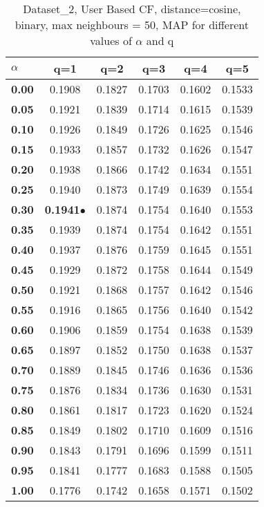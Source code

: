 \begin{table}
\begin{center}
\begin{tabular}{ | l || c | c | c | c | c |}
\hline
\textbf{$\alpha$} & \textbf{q=1} & \textbf{q=2} & \textbf{q=3} & \textbf{q=4} & \textbf{q=5} \\
\hline
\textbf{0.00} & 0.1908 & 0.1827 & 0.1703 & 0.1602 & 0.1533\\
\hline
\textbf{0.05} & 0.1921 & 0.1839 & 0.1714 & 0.1615 & 0.1539\\
\hline
\textbf{0.10} & 0.1926 & 0.1849 & 0.1726 & 0.1625 & 0.1546\\
\hline
\textbf{0.15} & 0.1933 & 0.1857 & 0.1732 & 0.1626 & 0.1547\\
\hline
\textbf{0.20} & 0.1938 & 0.1866 & 0.1742 & 0.1634 & 0.1551\\
\hline
\textbf{0.25} & 0.1940 & 0.1873 & 0.1749 & 0.1639 & 0.1554\\
\hline
\textbf{0.30} & \textbf{0.1941}$\bullet$ & 0.1874 & 0.1754 & 0.1640 & 0.1553\\
\hline
\textbf{0.35} & 0.1939 & 0.1874 & 0.1754 & 0.1642 & 0.1551\\
\hline
\textbf{0.40} & 0.1937 & 0.1876 & 0.1759 & 0.1645 & 0.1551\\
\hline
\textbf{0.45} & 0.1929 & 0.1872 & 0.1758 & 0.1644 & 0.1549\\
\hline
\textbf{0.50} & 0.1921 & 0.1868 & 0.1757 & 0.1642 & 0.1546\\
\hline
\textbf{0.55} & 0.1916 & 0.1865 & 0.1756 & 0.1640 & 0.1542\\
\hline
\textbf{0.60} & 0.1906 & 0.1859 & 0.1754 & 0.1638 & 0.1539\\
\hline
\textbf{0.65} & 0.1897 & 0.1852 & 0.1750 & 0.1638 & 0.1537\\
\hline
\textbf{0.70} & 0.1889 & 0.1845 & 0.1746 & 0.1636 & 0.1536\\
\hline
\textbf{0.75} & 0.1876 & 0.1834 & 0.1736 & 0.1630 & 0.1531\\
\hline
\textbf{0.80} & 0.1861 & 0.1817 & 0.1723 & 0.1620 & 0.1524\\
\hline
\textbf{0.85} & 0.1849 & 0.1802 & 0.1710 & 0.1609 & 0.1516\\
\hline
\textbf{0.90} & 0.1843 & 0.1791 & 0.1696 & 0.1599 & 0.1511\\
\hline
\textbf{0.95} & 0.1841 & 0.1777 & 0.1683 & 0.1588 & 0.1505\\
\hline
\textbf{1.00} & 0.1776 & 0.1742 & 0.1658 & 0.1571 & 0.1502\\
\hline
\end{tabular}
\caption{Dataset\_2, User Based CF, distance=cosine, binary, max neighbours = 50, MAP for different values of $\alpha$ and q}
\label{table:MAP_Dataset_2_ucf_cosine_binary_mnn=50}
\end{center}
\end{table}
